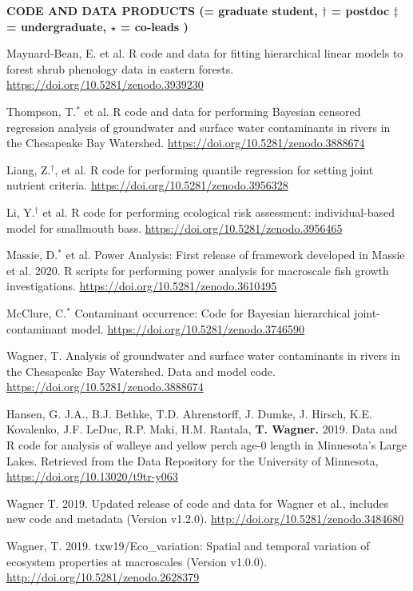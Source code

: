 \documentclass[10pt]{article}
\begin{document}
\begin{flushleft}
\centerline {\bf{CODE AND DATA PRODUCTS ({\small * = graduate student, $\dagger$ = postdoc $\ddagger$ = undergraduate, $\star$ = co-leads })}}
\vspace{5pt}
\begin{etaremune}
	\item Maynard-Bean, E. et al. R code and data for fitting hierarchical linear models to forest shrub phenology data in eastern forests. \url{https://doi.org/10.5281/zenodo.3939230}
	\item Thompson, T.$^*$ et al. R code and data for performing Bayesian censored regression analysis of groundwater and surface water contaminants in rivers in the Chesapeake Bay Watershed. \url{https://doi.org/10.5281/zenodo.3888674}
	\item Liang, Z.$^\dagger$, et al. R code for performing quantile regression for setting joint nutrient criteria. \url{https://doi.org/10.5281/zenodo.3956328}
	\item Li, Y.$^\dagger$ et al. R code for performing ecological risk assessment: individual-based model for smallmouth bass. \url{https://doi.org/10.5281/zenodo.3956465}
	\item Massie, D.$^*$ et al. Power Analysis: First release of framework developed in Massie et al. 2020. R scripts for performing power analysis for macroscale fish growth investigations. \url{https://doi.org/10.5281/zenodo.3610495}
	\item McClure, C.$^*$ Contaminant occurrence: Code for Bayesian hierarchical joint-contaminant model. \url{https://doi.org/10.5281/zenodo.3746590}
	\item Wagner, T. Analysis of groundwater and surface water contaminants in rivers in the Chesapeake Bay Watershed. Data and model code. \url{https://doi.org/10.5281/zenodo.3888674}
	\item Hansen, G. J.A., B.J. Bethke, T.D. Ahrenstorff,  J. Dumke, J.  Hirsch,  K.E. Kovalenko,  J.F. LeDuc, R.P.  Maki,  H.M. Rantala, \textbf{T. Wagner.} 2019. Data and R code for analysis of walleye and yellow perch age-0 length in Minnesota's Large Lakes. Retrieved from the Data Repository for the University of Minnesota, \url{https://doi.org/10.13020/t9tr-y063}
\item Wagner T. 2019. Updated release of code and data for Wagner et al., includes new code and metadata (Version v1.2.0). \url{http://doi.org/10.5281/zenodo.3484680}
	
\item Wagner, T. 2019. txw19/Eco\_variation: Spatial and temporal variation of ecosystem properties at macroscales (Version v1.0.0). \url{http://doi.org/10.5281/zenodo.2628379}
\end{etaremune}	


\end{flushleft}
\end{document}

